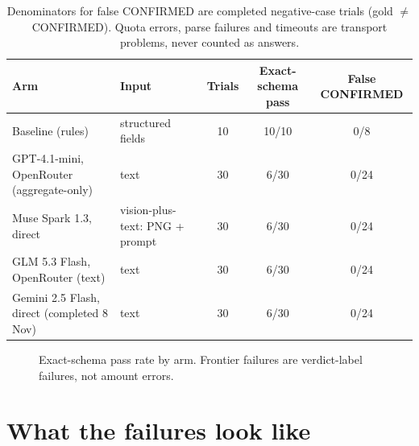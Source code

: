 \documentclass[11pt,a4paper]{article}
\begin{document}
\begin{table}[h]
\centering
{\small
\begin{tabular}{@{}p{4.4cm}p{3.4cm}ccc@{}}
\toprule
Arm & Input & Trials & Exact-schema pass & False CONFIRMED \\
\midrule
Baseline (rules) & structured fields & 10 & 10/10 & 0/8 \\
GPT-4.1-mini, OpenRouter (aggregate-only) & text & 30 & 6/30 & 0/24 \\
Muse Spark 1.3, direct & vision-plus-text: PNG + prompt & 30 & 6/30 & 0/24 \\
GLM 5.3 Flash, OpenRouter (text) & text & 30 & 6/30 & 0/24 \\
Gemini 2.5 Flash, direct (completed 8 Nov) & text & 30 & 6/30 & 0/24 \\
\bottomrule
\end{tabular}}
\caption{Denominators for false CONFIRMED are completed negative-case trials
(gold $\neq$ CONFIRMED). Quota errors, parse failures and timeouts are
transport problems, never counted as answers.}
\end{table}

\begin{figure}[h]
\centering
{}
\caption{Exact-schema pass rate by arm. Frontier failures are verdict-label
failures, not amount errors.}
\end{figure}

\section{What the failures look like}
\end{document}

